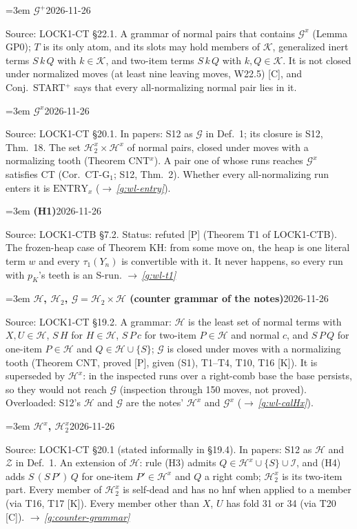 \documentclass[11pt]{amsart}
\makeatletter
\newcommand{\Hc}{\mathcal H}
\newcommand{\Ic}{\mathcal I}
\newcommand{\Gc}{\mathcal G}
\newcommand{\Kc}{\mathcal K}
\newcommand{\Zc}{\mathcal Z}
\newcounter{sense}
\newenvironment{entry}[3]{%
  \par\addvspace{\medskipamount}\noindent\phantomsection
  \def\@currentlabel{#2}\label{#1}\setcounter{sense}{0}\raggedright\emergencystretch=3em%
  \textbf{#2}\hfill{\footnotesize\textsf{#3}}\par\nopagebreak\noindent\ignorespaces}%
  {\par}
\newcommand{\src}[1]{\textsf{Source:} #1.\enskip}
\newcommand{\status}[1]{\textsf{Status:} #1.\enskip}
\newcommand{\appears}[1]{\textsf{In papers:} #1.\enskip}
\renewcommand{\see}[1]{$\rightarrow$\,\emph{\ref{#1}}}
\makeatother
\begin{document}
\begin{entry}{g:wl-calGplus}{$\Gc^{+}$}{2026-11-26}
\src{LOCK1-CT \S22.1}
A grammar of normal pairs that contains $\Gc^{x}$ (Lemma GP0); $T$ is its only atom, and its slots may
hold members of $\Kc$, generalized inert terms $S\,k\,Q$ with $k\in\Kc$, and two-item terms $S\,k\,Q$
with $k,Q\in\Kc$. It is not closed under normalized moves (at least nine leaving moves, W22.5) [C], and
Conj.~START$^{+}$ says that every all-normalizing normal pair lies in it.
\end{entry}

\begin{entry}{g:wl-calGx}{$\Gc^{x}$}{2026-11-26}
\src{LOCK1-CT \S20.1}
\appears{S12 as $\Gc$ in Def.~1; its closure is S12, Thm.~18}
The set $\Hc^{x}_2\times\Hc^{x}$ of normal pairs, closed under moves with a normalizing tooth (Theorem
CNT$^{x}$). A pair one of whose runs reaches $\Gc^{x}$ satisfies CT (Cor.~CT-G$_1$; S12, Thm.~2).
Whether every all-normalizing run enters it is $\mathrm{ENTRY}_x$ (\see{g:wl-entry}).
\end{entry}

\begin{entry}{g:wl-h1}{(H1)}{2026-11-26}
\src{LOCK1-CTB \S7.2}
\status{refuted [P] (Theorem T1 of LOCK1-CTB)}
The frozen-heap case of Theorem KH: from some move on, the heap is one literal term $w$ and every
$\tau_1(Y_n)$ is convertible with it. It never happens, so every run with $p_K$'s teeth is an S-run.
\see{g:wl-t1}
\end{entry}

\begin{entry}{g:wl-calH}{$\Hc$, $\Hc_2$, $\Gc=\Hc_2\times\Hc$ (counter grammar of the notes)}{2026-11-26}
\src{LOCK1-CT \S19.2}
A grammar: $\Hc$ is the least set of normal terms with $X,U\in\Hc$, $S\,H$ for $H\in\Hc$, $S\,P\,c$ for
two-item $P\in\Hc$ and normal $c$, and $S\,P\,Q$ for one-item $P\in\Hc$ and $Q\in\Hc\cup\{S\}$; $\Gc$ is
closed under moves with a normalizing tooth (Theorem CNT, proved [P], given (S1), T1--T4, T10, T16
[K]). It is superseded by $\Hc^{x}$: in the inspected runs over a right-comb base the base persists,
so they would not reach $\Gc$ (inspection through 150 moves, not proved). Overloaded: S12's $\Hc$ and
$\Gc$ are the notes' $\Hc^{x}$ and $\Gc^{x}$ (\see{g:wl-calHx}).
\end{entry}

\begin{entry}{g:wl-calHx}{$\Hc^{x}$, $\Hc^{x}_2$}{2026-11-26}
\src{LOCK1-CT \S20.1 (stated informally in \S19.4)}
\appears{S12 as $\Hc$ and $\Zc$ in Def.~1}
An extension of $\Hc$: rule (H3) admits $Q\in\Hc^{x}\cup\{S\}\cup\Ic$, and (H4) adds $S\,(S\,P')\,Q$ for
one-item $P'\in\Hc^{x}$ and $Q$ a right comb; $\Hc^{x}_2$ is its two-item part. Every member of
$\Hc^{x}_2$ is self-dead and has no hnf when applied to a member (via T16, T17 [K]). Every member other
than $X$, $U$ has fold 31 or 34 (via T20 [C]). \see{g:counter-grammar}
\end{entry}
\end{document}
